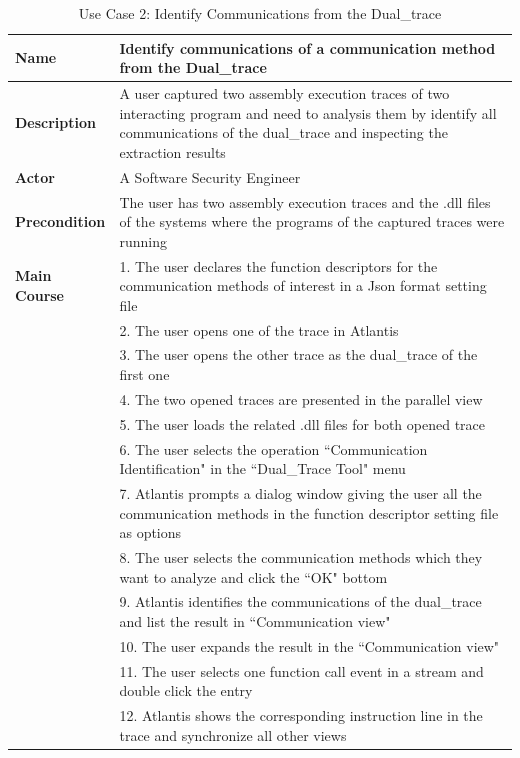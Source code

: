 \begin{table}[H]
  \centering
  \caption{Use Case 2: Identify Communications from the Dual\_trace}
  \label{usecase2}
  \begin{tabular}{|l|p{13cm}|}
      \hline
       \textbf{Name} & Identify communications of a communication method from the Dual\_trace\\
       \hline
       \textbf{Description} & A user captured two assembly execution traces of two interacting program and need to analysis them by identify all communications of the dual\_trace and inspecting the extraction results \\
       \hline
              \textbf{Actor} & A Software Security Engineer \\
       \hline
      \textbf{Precondition} & The user has two assembly execution traces and the .dll files of the systems where the programs of the captured traces were running\\
       \hline
       \textbf{Main Course}& 1. The user declares the function descriptors for the communication methods of interest in a Json format setting file\\
        & 2. The user opens one of the trace in Atlantis\\
       &  3. The user opens the other trace as the dual\_trace of the first one\\
       & 4. The two opened traces are presented in the parallel view\\
       & 5. The user loads the related .dll files for both opened trace\\
       & 6. The user selects the operation ``Communication Identification" in the ``Dual\_Trace Tool" menu\\
      & 7. Atlantis prompts a dialog window giving the user all the communication methods in the function descriptor setting file as options\\
       & 8. The user selects the communication methods which they want to analyze and click the ``OK" bottom\\
       & 9. Atlantis identifies the communications of the dual\_trace and list the result in ``Communication view"\\
       & 10. The user expands the result in the ``Communication view"\\
       & 11. The user selects one function call event in a stream and double click the entry\\
       & 12. Atlantis shows the corresponding instruction line in the trace and synchronize all other views\\
      \hline               
  \end{tabular}
\end{table}

